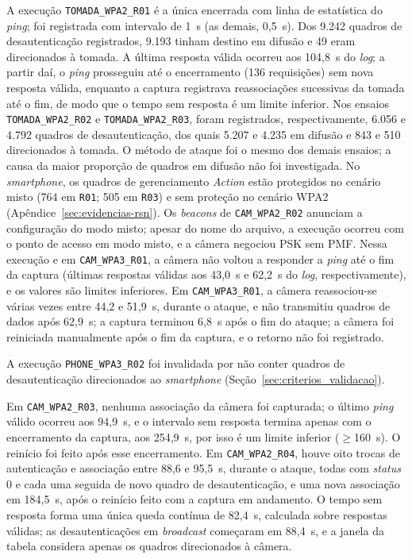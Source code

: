 A execução \texttt{TOMADA\_WPA2\_R01} é a única encerrada com linha de estatística do \textit{ping}; foi registrada com intervalo de 1~s (as demais, 0,5~s). Dos 9.242 quadros de desautenticação registrados, 9.193 tinham destino em difusão e 49 eram direcionados à tomada. A última resposta válida ocorreu aos 104,8~s do \textit{log}; a partir daí, o \textit{ping} prosseguiu até o encerramento (136 requisições) sem nova resposta válida, enquanto a captura registrava reassociações sucessivas da tomada até o fim, de modo que o tempo sem resposta é um limite inferior. Nos ensaios \texttt{TOMADA\_WPA2\_R02} e \texttt{TOMADA\_WPA2\_R03}, foram registrados, respectivamente, 6.056 e 4.792 quadros de desautenticação, dos quais 5.207 e 4.235 em difusão e 843 e 510 direcionados à tomada. O método de ataque foi o mesmo dos demais ensaios; a causa da maior proporção de quadros em difusão não foi investigada. No \textit{smartphone}, os quadros de gerenciamento \textit{Action} estão protegidos no cenário misto (764 em \texttt{R01}; 505 em \texttt{R03}) e sem proteção no cenário WPA2 (Apêndice~\ref{sec:evidencias-rsn}). Os \textit{beacons} de \texttt{CAM\_WPA2\_R02} anunciam a configuração do modo misto; apesar do nome do arquivo, a execução ocorreu com o ponto de acesso em modo misto, e a câmera negociou PSK sem PMF. Nessa execução e em \texttt{CAM\_WPA3\_R01}, a câmera não voltou a responder a \textit{ping} até o fim da captura (últimas respostas válidas aos 43,0~s e 62,2~s do \textit{log}, respectivamente), e os valores são limites inferiores. Em \texttt{CAM\_WPA3\_R01}, a câmera reassociou-se várias vezes entre 44,2 e 51,9~s, durante o ataque, e não transmitiu quadros de dados após 62,9~s; a captura terminou 6,8~s após o fim do ataque; a câmera foi reiniciada manualmente após o fim da captura, e o retorno não foi registrado.

A execução \texttt{PHONE\_WPA3\_R02} foi invalidada por não conter quadros de desautenticação direcionados ao \textit{smartphone} (Seção~\ref{sec:criterios_validacao}).

Em \texttt{CAM\_WPA2\_R03}, nenhuma associação da câmera foi capturada; o último \textit{ping} válido ocorreu aos 94,9~s, e o intervalo sem resposta termina apenas com o encerramento da captura, aos 254,9~s, por isso é um limite inferior ($\geq$160~s). O reinício foi feito após esse encerramento. Em \texttt{CAM\_WPA2\_R04}, houve oito trocas de autenticação e associação entre 88,6 e 95,5~s, durante o ataque, todas com \textit{status} 0 e cada uma seguida de novo quadro de desautenticação, e uma nova associação em 184,5~s, após o reinício feito com a captura em andamento. O tempo sem resposta forma uma única queda contínua de 82,4~s, calculada sobre respostas válidas; as desautenticações em \textit{broadcast} começaram em 88,4~s, e a janela da tabela considera apenas os quadros direcionados à câmera.

